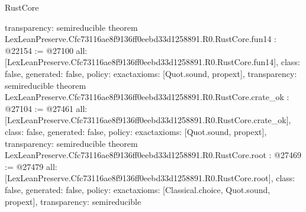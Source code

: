 \begin{lexlean}{RustCore}
\begin{coremodule}
{  transparency: semireducible
}
theorem LexLeanPreserve.Cfc73116ae8f9136ff0eebd33d1258891.R0.RustCore.fun14 : @22154 := @27100 {
  all: [LexLeanPreserve.Cfc73116ae8f9136ff0eebd33d1258891.R0.RustCore.fun14],
  class: false,
  generated: false,
  policy: exact{axioms: [Quot.sound, propext]},
  transparency: semireducible
}
theorem LexLeanPreserve.Cfc73116ae8f9136ff0eebd33d1258891.R0.RustCore.crate_ok : @27104 := @27461 {
  all: [LexLeanPreserve.Cfc73116ae8f9136ff0eebd33d1258891.R0.RustCore.crate_ok],
  class: false,
  generated: false,
  policy: exact{axioms: [Quot.sound, propext]},
  transparency: semireducible
}
theorem LexLeanPreserve.Cfc73116ae8f9136ff0eebd33d1258891.R0.RustCore.root : @27469 := @27479 {
  all: [LexLeanPreserve.Cfc73116ae8f9136ff0eebd33d1258891.R0.RustCore.root],
  class: false,
  generated: false,
  policy: exact{axioms: [Classical.choice, Quot.sound, propext]},
  transparency: semireducible
}


\end{coremodule}
\end{lexlean}
